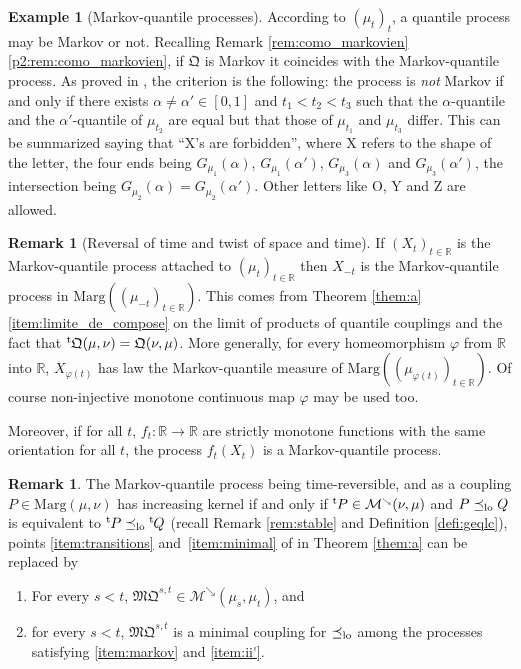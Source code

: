 \documentclass[JEP,XML,SOM,Unicode,NoEqCountersInSection,NoFloatCountersInSection,published]{cedram}
\renewcommand{\theenumi}{\alph{enumi}}
\renewcommand{\theenumii}{\roman{enumii}}
\newenvironment{enumeratei}
{\bgroup\def\theenumi{\roman{enumi}}\def\theenumii{\arabic{enumii}}\begin{enumerate}}
{\end{enumerate}\egroup}
\theoremstyle{plain}
\theoremstyle{definition}
\newtheorem{rem}[them]{Remark}
\newtheorem{ex}[them]{Example}
\newcommand{\como}{\mathfrak{Q}}
\newcommand{\mq}{\mathfrak{MQ}}
\newcommand{\trans}{{}^{\mathrm{t}}\mkern-1mu}
\newcommand{\ma}{\mathrm{Marg}}
\newcommand{\R}{\mathbb{R}}
\newcommand{\mdec}{\mathcal{M}^{\scriptscriptstyle\searrow}}
\newcommand{\leqlc}{\preceq_{\rm lo}}
\begin{document}
\begin{ex}[Markov-quantile processes]\label{ex:quantile}
According to $(\mu_t)_t$, a quantile process may be Markov or not. Recalling Remark \ref{rem:como_markovien} \eqref{p2:rem:como_markovien}, if $\como$ is Markov it coincides with the Markov-quantile process. As proved in \cite[Prop.\,3]{Ju_seminaire}, the criterion is the following: the process is \emph{not} Markov if and only if there exists $\alpha\neq \alpha'\in [0,1]$ and $t_1<t_2<t_3$ such that the $\alpha$-quantile and the $\alpha'$-quantile of $\mu_{t_2}$ are equal but that those of $\mu_{t_1}$ and $\mu_{t_3}$ differ. This can be summarized saying that ``X's are forbidden'', where X refers to the shape of the letter, the four ends being $G_{\mu_1}(\alpha)$, $G_{\mu_1}(\alpha')$, $G_{\mu_3}(\alpha)$ and $G_{\mu_3}(\alpha')$, the intersection being $G_{\mu_2}(\alpha)=G_{\mu_2}(\alpha')$. Other letters like O, Y and Z are allowed.
\end{ex}

\begin{rem}[Reversal of time and twist of space and time]\label{ex:reversed}
If $(X_t)_{t\in \R}$ is the Markov-quantile process attached to $(\mu_t)_{t\in\R}$ then $X_{-t}$ is the Markov-quantile process in $\ma((\mu_{-t})_{t\in \R})$. This comes from Theorem \ref{them:a} \eqref{item:limite_de_compose} on the limit of products of quantile couplings and the fact that $\trans \como(\mu,\nu)=\como(\nu,\mu)$. More generally, for every homeomorphism $\varphi$ from $\R$ into $\R$, $X_{\varphi(t)}$ has law the Markov-quantile measure of $\ma((\mu_{\varphi(t)})_{t\in \R})$. Of course non-injective monotone continuous map $\varphi$ may be used too.

Moreover, if for all $t$, $f_t:\R\to \R$ are strictly monotone functions with the same orientation for all $t$, the process $f_t(X_t)$ is a Markov-quantile process.
\end{rem}

\begin{rem}
The Markov-quantile process being time-reversible, and as a coupling $P\in \ma(\mu,\nu)$ has increasing kernel if and only if $\trans P\in\mdec(\nu,\mu)$ and $P \leqlc Q$ is equivalent to $\trans P\leqlc \trans Q$ (recall Remark \ref{rem:stable} and Definition \ref{defi:geqlc}), points \eqref{item:transitions} and~\eqref{item:minimal} of in Theorem \ref{them:a} can be replaced by
\begin{enumeratei}\renewcommand{\theenumi}{\roman{enumi}'}
\item\label{item:ii'}
For every $s<t$, $\mq^{s,t}\in\mdec(\mu_s,\mu_t)$, and
\item\label{item:iii'}
for every $s<t$, $\mq^{s,t}$ is a minimal coupling for $\leqlc$ among the processes satisfying \eqref{item:markov} and \eqref{item:ii'}.
\end{enumeratei}
\end{rem}
\end{document}

